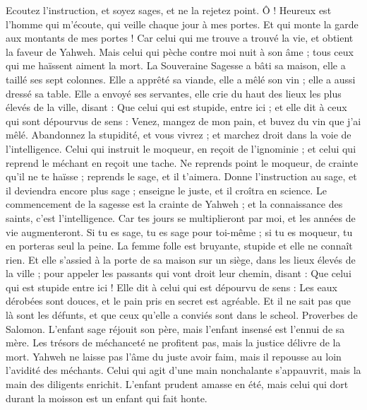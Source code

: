 \begin{multicols}{2}
Ecoutez l’instruction, et soyez sages, et ne la rejetez point.
Ô ! Heureux est l'homme qui m'écoute, qui veille chaque jour à mes portes. Et qui monte la garde aux montants de mes portes !
Car celui qui me trouve a trouvé la vie, et obtient la faveur de Yahweh.
Mais celui qui pèche contre moi nuit à son âme ; tous ceux qui me haïssent aiment la mort.
\VerseOne{}La Souveraine Sagesse a bâti sa maison, elle a taillé ses sept colonnes.
Elle a apprêté sa viande, elle a mêlé son vin ; elle a aussi dressé sa table.
Elle a envoyé ses servantes, elle crie du haut des lieux les plus élevés de la ville, disant : 
Que celui qui est stupide, entre ici ; et elle dit à ceux qui sont dépourvus de sens :
Venez, mangez de mon pain, et buvez du vin que j'ai mêlé.
Abandonnez la stupidité, et vous vivrez ; et marchez droit dans la voie de l’intelligence.
Celui qui instruit le moqueur, en reçoit de l’ignominie ; et celui qui reprend le méchant en reçoit une tache.
Ne reprends point le moqueur, de crainte qu'il ne te haïsse ; reprends le sage, et il t'aimera.
Donne l’instruction au sage, et il deviendra encore plus sage ; enseigne le juste, et il croîtra en science.
Le commencement de la sagesse est la crainte de Yahweh ; et la connaissance des saints, c'est l’intelligence.
Car tes jours se multiplieront par moi, et les années de vie augmenteront.
Si tu es sage, tu es sage pour toi-même ; si tu es moqueur, tu en porteras seul la peine.
La femme folle est bruyante, stupide et elle ne connaît rien.
Et elle s’assied à la porte de sa maison sur un siège, dans les lieux élevés de la ville ;
pour appeler les passants qui vont droit leur chemin, disant :
Que celui qui est stupide entre ici ! Elle dit à celui qui est dépourvu de sens :
Les eaux dérobées sont douces, et le pain pris en secret est agréable.
Et il ne sait pas que là sont les défunts, et que ceux qu'elle a conviés sont dans le scheol.
\VerseOne{}Proverbes de Salomon. L'enfant sage réjouit son père, mais l'enfant insensé est l'ennui de sa mère.
Les trésors de méchanceté ne profitent pas, mais la justice délivre de la mort.
Yahweh ne laisse pas l’âme du juste avoir faim, mais il repousse au loin l’avidité des méchants.
Celui qui agit d’une main nonchalante s’appauvrit, mais la main des diligents enrichit.
L'enfant prudent amasse en été, mais celui qui dort durant la moisson est un enfant qui fait honte.

\end{multicols}
